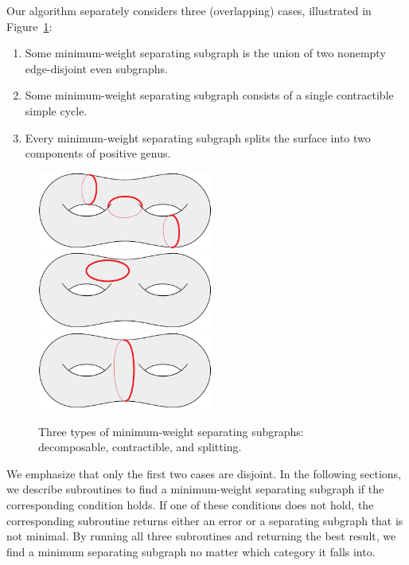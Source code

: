 \documentclass[twoside,leqno,twocolumn]{article}
\begin{document}
 Our algorithm separately considers three (overlapping) cases, illustrated in Figure~\ref{F:3cases}:
\begin{enumerate}
  \item
    Some minimum-weight separating subgraph is the union of two nonempty edge-disjoint even subgraphs.
  \item
    Some minimum-weight separating subgraph consists of a single contractible simple cycle.
  \item
    Every minimum-weight separating subgraph splits the surface into two components of positive genus.
\end{enumerate}
%
\begin{figure}[hb]
\centering
\includegraphics[height=1in]{Fig/homologous1}\\[1ex]
\includegraphics[height=1in]{Fig/shortcon2}\\[1ex]
\includegraphics[height=1in]{Fig/shortsep2}\\[1ex]
\caption{Three types of minimum-weight separating subgraphs: decomposable, contractible, and splitting.}
\label{F:3cases}
\end{figure}
%

We emphasize that only the first two cases are disjoint.  In the following sections, we describe subroutines to find a minimum-weight separating subgraph if the corresponding condition holds.  If one of these conditions does not hold, the corresponding subroutine returns either an error or a separating subgraph that is not minimal.  By running all three subroutines and returning the best result, we find a minimum separating subgraph no matter which category it falls into.
\end{document}
